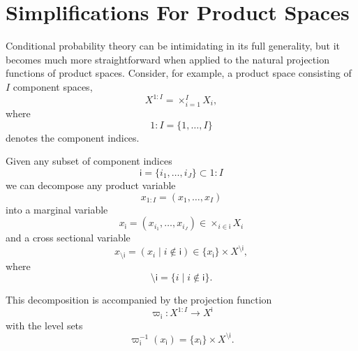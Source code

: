 \documentclass[11pt, oneside]{article}
\begin{document}
\section{Simplifications For Product Spaces}

Conditional probability theory can be intimidating in its full generality, but it becomes 
much more straightforward when applied to the natural projection functions of product 
spaces.  Consider, for example, a product space consisting of $I$ component spaces,
%
\begin{equation*}
X^{1:I} = \times_{i = 1}^{I} X_{i},
\end{equation*}
%
where 
%
\begin{equation*}
1 \! : \! I = \{1, \ldots, I\}
\end{equation*}
%
denotes the component indices.

Given any subset of component indices 
%
\begin{equation*}
\mathsf{i} = \{ i_{1}, \ldots, i_{J} \} \subset 1 \! : \! I
\end{equation*}
% 
we can decompose any product variable 
%
\begin{equation*}
x_{1:I} = (x_{1}, \ldots, x_{I})
\end{equation*}
%
into a marginal variable
%
\begin{equation*}
x_{\mathsf{i}} = (x_{i_{1}}, \ldots, x_{i_{J}}) \in \times_{i \in \mathsf{i} } X_{i}
\end{equation*}
%
and a cross sectional variable
%
\begin{equation*}
x_{\setminus \mathsf{i}} 
= ( x_{i} \mid i \notin \mathsf{i} ) 
\in \{ x_{\mathsf{i}} \} \times X^{\setminus \mathsf{i}},
\end{equation*}
%
where
%
\begin{equation*}
\setminus \mathsf{i} = \{ i \mid i \notin \mathsf{i} \}.
\end{equation*}

This decomposition is accompanied by the projection function
%
\begin{equation*}
\varpi_{\mathsf{i}} : X^{1:I} \rightarrow X^{\mathsf{i}}
\end{equation*}
%
with the level sets
%
\begin{equation*}
\varpi_{\mathsf{i}}^{-1}( x_{\mathsf{i}} ) 
= \{ x_{\mathsf{i}} \} \times X^{\setminus \mathsf{i}}.
\end{equation*}
\end{document}
